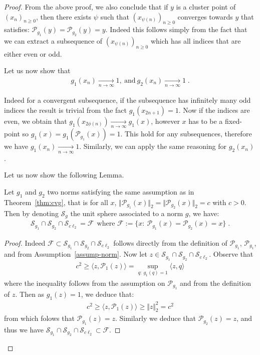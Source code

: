 \begin{proof}
From the above proof, we also conclude that if $y$ is a cluster point of $(x_n)_{n\geq 0}$, then there exists $\psi$ such that $(x_{\psi(n)})_{n\geq 0}$ converges towards $y$ that satisfies:
$\mathcal{P}_{g_1}(y)=\mathcal{P}_{g_2}(y)=y$. Indeed this follows simply from the fact that we can extract a subsequence of $(x_{\psi(n)})_{n\geq 0}$ which has all indices that are either even or odd.

Let us now show that 
\begin{align*}
    g_1(x_n)\xrightarrow[n\to\infty]{} 1,~\text{and}~
    g_2(x_n)\xrightarrow[n\to\infty]{} 1\; .
\end{align*}

Indeed for a convergent subsequence, if the subsequence has infinitely many odd indices the result is trivial from the fact $g_1(x_{2n+1})=1$. Now if the indices are even, we obtain that $g_1(x_{2\phi(n)})\xrightarrow[n\to\infty]{}g_1(x)$, however $x$ has to be a fixed-point so $g_1(x)=g_1(\mathcal{P}_{g_1}(x))=1$. This hold for any subsequences, therefore we have $g_1(x_n)\xrightarrow[n\to\infty]{}1$. Similarly, we can apply the same reasoning for $g_2(x_n)$.

Let us now show the following Lemma.

\begin{lemma}
\label{lem-set-view}
Let $g_1$ and $g_2$ two norms satisfying the same assumption as in Theorem~\ref{thm:cvg}, that is for all $x$, $\Vert \mathcal{P}_{g_1}(x) \Vert_2 = \Vert \mathcal{P}_{g_2}(x)\Vert_2 = c$ with $c>0$. Then by denoting $\mathcal{S}_{g}$ the unit sphere associated to a norm $g$, we have:
\begin{align*}
    \mathcal{S}_{g_1}\cap \mathcal{S}_{g_2}\cap\mathcal{S}_{c\ell_2} = \mathcal{F}~~\text{where  }\mathcal{F}:=\{x:~\mathcal{P}_{g_1}(x)=\mathcal{P}_{g_2}(x)=x\}\; .
\end{align*}
\end{lemma}
\begin{proof}
Indeed $\mathcal{F}\subset \mathcal{S}_{g_1}\cap \mathcal{S}_{g_2}\cap\mathcal{S}_{c\ell_2} $ follows directly from the definition of $\mathcal{P}_{g_1}$, $\mathcal{P}_{g_1}$, and from Assumption~\ref{assump-norm}. Now let $z\in  \mathcal{S}_{g_1}\cap \mathcal{S}_{g_2}\cap\mathcal{S}_{c\ell_2}$. Observe that
\begin{align*}
    c^2\geq \langle z, \mathcal{P}_{1}(z)\rangle = \sup_{q:~g_1(q)=1}\langle z, q\rangle 
\end{align*}
where the inequality follows from the assumption on $\mathcal{P}_{g_1}$ and from the definition of $z$. Then as $g_1(z)=1$, we deduce that:
\begin{align*}
     c^2\geq \langle z, \mathcal{P}_{1}(z)\rangle \geq \Vert z\Vert_2^2=c^2
\end{align*}
from which folows that $\mathcal{P}_{g_1}(z)=z$. Similarly we deduce that $\mathcal{P}_{g_2}(z)=z$, and thus we have $\mathcal{S}_{g_1}\cap \mathcal{S}_{g_2}\cap\mathcal{S}_{c\ell_2}\subset \mathcal{F} $.
\end{proof}



\end{proof}
